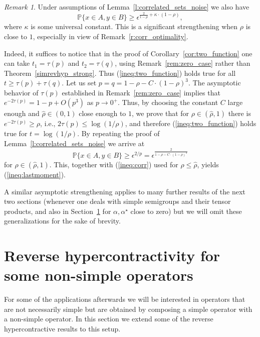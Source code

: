 \documentclass[11pt]{amsart}
\newcommand{\PP}{\mathbb{P}}
\newcommand{\eps}{\epsilon}
\newcommand{\gas}{\alpha^{\star}}
\newcommand{\1}{\mathbf{1}}
\theoremstyle{definition}
\theoremstyle{plain}
\theoremstyle{remark}
\newtheorem{remark}[example]{Remark}
\numberwithin{equation}{section}
\begin{document}
\begin{remark} \label{rem:lastmoment} Under assumptions of Lemma~\ref{l:correlated_sets_noise} we also have
\begin{equation} \label{ineq:lastmoment}
\PP\{ x \in A, y \in B\} \ge \eps^{\frac{2}{1-\rho}+\kappa \cdot (1-\rho)},
\end{equation}
where $\kappa$ is some universal constant. This is a significant strengthening when $\rho$ is close to $1$, especially in view of
Remark~\ref{r:corr_optimality}.

Indeed, it suffices to notice that in the proof of Corollary~\ref{cor:two_function} one can take $t_{1}=\tau(p)$
and $t_{2}=\tau(q)$, using Remark~\ref{rem:zero_case} rather than Theorem~\ref{simrevhyp_strong}. Thus
(\ref{ineq:two_function})
holds true for all $t \geq \tau(p)+\tau(q)$. Let us set $p=q=1-\rho-C \cdot (1-\rho)^{3}$.
The asymptotic behavior of $\tau(p)$ established in Remark~\ref{rem:zero_case} implies that $e^{-2\tau(p)}=1-p+O(p^{3})$
as $p \rightarrow 0^{+}$. Thus, by choosing the constant $C$ large enough and $\hat{\rho} \in (0,1)$ close enough
to $1$, we prove that for $\rho \in (\hat{\rho},1)$ there is $e^{-2\tau(p)} \geq \rho$, i.e.,
$2\tau(p) \leq \log(1/\rho)$, and therefore (\ref{ineq:two_function}) holds true for $t=\log(1/\rho)$.
By repeating the proof of Lemma~\ref{l:correlated_sets_noise} we arrive at 
\[
\PP\{ x \in A, y \in B\} \ge \eps^{2/p}=\eps^{\frac{2}{1-\rho-C \cdot (1-\rho)^{3}}}
\]
for $\rho \in (\hat{\rho},1)$. This, together with (\ref{ineq:corr}) used for $\rho \leq \hat{\rho}$,
yields (\ref{ineq:lastmoment}).

A similar asymptotic strengthening applies to many further results of the next two sections (whenever one deals with simple semigroups and their tensor products, and also in Section~\ref{sec:non-simple} for $\alpha, \gas$ close to zero) but we will omit these generalizations for the sake of brevity.
\end{remark}

\section{Reverse hypercontractivity for some non-simple operators} \label{sec:non-simple}
For some of the applications afterwards we will be interested in operators that are not necessarily simple but are obtained by composing a simple operator
with a non-simple operator. In this section we extend some of the reverse hypercontractive results to this setup.
\end{document}
